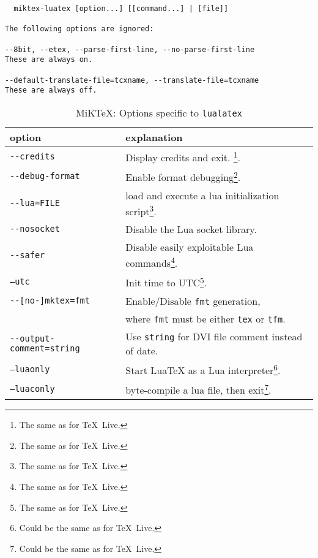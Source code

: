 \documentclass{article}
\newcommand{\lualatex}{\texttt{lualatex}}
\newcommand{\texlive}{\TeX~Live}
\newcommand{\miktex}{MiKTeX}
\begin{document}
\begin{verbatim}
  miktex-luatex [option...] [[command...] | [file]]

The following options are ignored:

--8bit, --etex, --parse-first-line, --no-parse-first-line
These are always on.

--default-translate-file=tcxname, --translate-file=tcxname
These are always off.
\end{verbatim}

\begin{longtable}{|ll|}
  \toprule
  option & explanation \\
  \midrule
  \midrule
  \endfirsthead%
  \bottomrule
  \caption{\label{tab:latexOptionsLualatexMiktex} \miktex: Options specific to \lualatex{} }
  \endlastfoot%
  \texttt{-{}-credits}                    & Display credits and exit. \footnote%
  {The same as for \texlive. }. \\
  \texttt{-{}-debug-format}               & Enable format debugging\footnote%
  {The same as for \texlive. }. \\
  \texttt{-{}-lua=FILE}                   & load and execute a lua initialization script\footnote%
  {The same as for \texlive. }.   \\
  \texttt{-{}-nosocket}                   & Disable the Lua socket library. \\
  \texttt{-{}-safer}                      & Disable easily exploitable Lua commands\footnote%
  {The same as for \texlive. }.   \\
  \texttt{--utc}                          & Init time to UTC\footnote%
  {The same as for \texlive. }.  \\
  \midrule
  \texttt{-{}-[no-]mktex=fmt} & Enable/Disable \texttt{fmt} generation, \\
                              & where \texttt{fmt} must be either \texttt{tex} or \texttt{tfm}. \\
  \texttt{-{}-output-comment=string} & Use \texttt{string} for DVI file comment instead of date. \\
  \midrule
  \texttt{--luaonly}                      & Start LuaTeX as a Lua interpreter\footnote%
  {Could be the same as for \texlive. }.  \\
  \texttt{--luaconly}                     & byte-compile a lua file, then exit\footnote%
  {Could be the same as for \texlive. }. \\
  \end{longtable}
\end{document}
